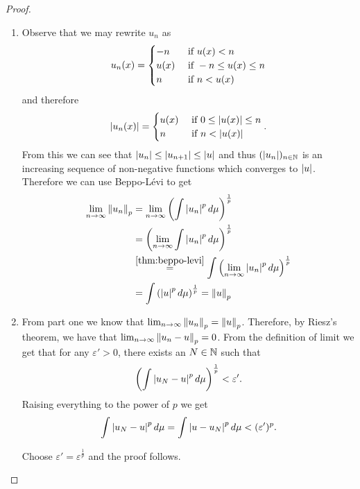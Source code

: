 \begin{proof}$ $\newline
	\begin{enumerate}
		\item Observe that we may rewrite $u_n$ as
		\begin{align*}
			u_n(x) = \begin{cases}
			-n &\text{ if } u(x) < n\\
			u(x) &\text{ if } -n \leq u(x) \leq n \\
			n &\text{ if } n < u(x)
			\end{cases}
		\end{align*}
		and therefore
		\begin{align*}
			\left\vert{u_n(x)}\right\vert = \begin{cases}
			u(x) &\text{ if } 0 \leq \left\vert{u(x)}\right\vert \leq n\\
			n &\text{ if } n < \left\vert{u(x)}\right\vert
			\end{cases}.
		\end{align*}
		From this we can see that $\left\vert{u_n}\right\vert \leq \left\vert{u_{n+1}}\right\vert \leq \left\vert{u}\right\vert$ and thus $(\left\vert{u_n}\right\vert)_{n\in\mathbb{N}}$ is an increasing sequence of non-negative functions which converges to $\left\vert{u}\right\vert$. Therefore we can use Beppo-Lévi to get
		\begin{align*}
			\lim_{n\to\infty} \left\Vert{u_n}\right\Vert_p
			&= \lim_{n\to\infty} \left( \int \left\vert{u_n}\right\vert^pd\mu \right)^{\frac{1}{p}}\\
			&= \left(\lim_{n\to\infty} \int \left\vert{u_n}\right\vert^pd\mu \right)^{\frac{1}{p}}\\
			&\overset{\ref{thm:beppo-levi}}{=} \int \left(\lim_{n\to\infty} \left\vert{u_n}\right\vert^pd\mu \right)^{\frac{1}{p}}\\
			&= \int \left(\left\vert{u}\right\vert^pd\mu \right)^{\frac{1}{p}}
			= \left\Vert{u}\right\Vert_p
		\end{align*}
		\item From part one we know that $\lim_{n\to\infty} \left\Vert{u_n}\right\Vert_p = \left\Vert{u}\right\Vert_p$. Therefore, by Riesz's theorem, we have that $\lim_{n\to\infty}\left\Vert{u_n - u}\right\Vert_p = 0$. From the definition of limit we get that for any $\varepsilon' > 0$, there exists an $N \in \mathbb{N}$ such that
		\begin{align*}
		\left( \int \left\vert{u_N - u}\right\vert^p d\mu \right)^{\frac{1}{p}} < \varepsilon'.
		\end{align*}
		Raising everything to the power of $p$ we get
		\begin{align*}
		\int \left\vert{u_N - u}\right\vert^p d\mu = \int \left\vert{u - u_N}\right\vert^p d\mu < (\varepsilon')^p.
		\end{align*}
		
		Choose $\varepsilon' = \varepsilon^{\frac{1}{p}}$ and the proof follows.
	\end{enumerate}
\end{proof}


